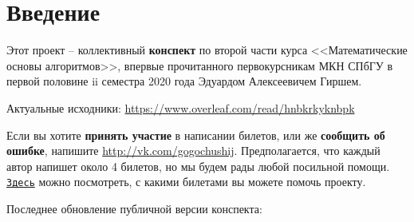 \section*{Введение}

Этот проект -- коллективный \textbf{конспект} по второй части курса <<Математические основы алгоритмов>>, впервые прочитанного первокурсникам МКН СПбГУ в первой половине ii семестра 2020 года Эдуардом Алексеевичем Гиршем. 

Актуальные исходники: \url{https://www.overleaf.com/read/hnbkrkyknbpk}

Если вы хотите \textbf{принять участие} в написании билетов, или же 
\textbf{сообщить об ошибке}, напишите \url{http://vk.com/gogochushij}. Предполагается, что каждый автор напишет около 4 билетов, но мы будем рады любой посильной помощи. \href{https://docs.google.com/spreadsheets/d/17MKhLVzCyYvEKlm6W5Bb-6uUDNyv0QLmdvuh4N6JfXI/edit?usp=sharing}{\texttt{Здесь}} можно посмотреть, с какими билетами вы можете помочь проекту.

Последнее обновление публичной версии конспекта: \date{\today}
